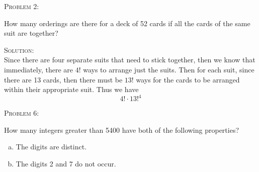 \documentclass[12pt,oneside]{article}
\newenvironment{problem}[1]
{\begin{mdframed}
        \textsc{Problem #1:}

		}
		    {\end{mdframed}}
\newenvironment{solution}
			    {\textsc{Solution:}\\}
				    {\newpage}
\begin{document}




					\begin{problem}{2}
					How many orderings are there for a deck of 52 cards if all the cards of the same suit are together?
					\end{problem}

					\begin{solution}

					Since there are four separate suits that need to stick together, then we know that immediately, there are $4!$ ways to arrange just the suits.  Then for each suit, since there are 13 cards, then there must be $13!$ ways for the cards to be arranged within their appropriate suit.  Thus we have
					\[ 4!\cdot13!^4\]





					\end{solution}


					\begin{problem}{6}
					How many integers greater than 5400 have both of the following properties?
					\begin{enumerate}[(a)]
					  \item The digits are distinct.
					    \item The digits 2 and 7 do not occur.
						\end{enumerate}
						\end{problem}
\end{document}
